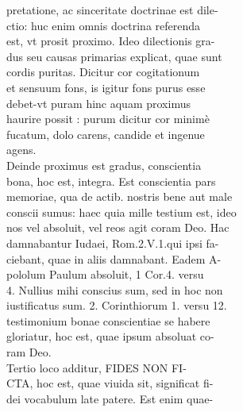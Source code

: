 \documentclass{article}
\begin{document}
\begin{pages}
                pretatione, ac sinceritate doctrinae est dile- \\
                ctio: huc enim omnis doctrina referenda \\
                est, vt prosit proximo. Ideo dilectionis gra- \\
                dus seu causas primarias explicat, quae sunt \\
                cordis puritas. Dicitur cor cogitationum \\
                et sensuum fons, is igitur fons purus esse \\
                debet-vt puram hinc aquam proximus \\
                haurire possit : purum dicitur cor minimè \\
                fucatum, dolo carens, candide et ingenue \\
                agens. \\
                Deinde proximus est gradus, conscientia \\
                bona, hoc est, integra. Est conscientia pars \\
                memoriae, qua de actib. nostris bene aut male \\
                conscii sumus: haec quia mille testium est, ideo \\
                nos vel absoluit, vel reos agit coram Deo. Hac \\
                damnabantur Iudaei, Rom.2.V.1.qui ipsi fa- \\
                ciebant, quae in aliis damnabant. Eadem A- \\
                pololum Paulum absoluit, 1 Cor.4. versu \\
                4. Nullius mihi conscius sum, sed in hoc non \\
                iustificatus sum. 2. Corinthiorum 1. versu 12. \\
                testimonium bonae conscientiae se habere \\
                gloriatur, hoc est, quae ipsum absoluat co- \\
                ram Deo. \\
                Tertio loco additur, FIDES NON FI- \\
                CTA, hoc est, quae viuida sit, significat fi- \\
                dei vocabulum late patere. Est enim quae- \\

\end{pages}
\end{document}
